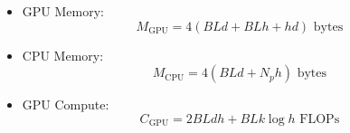 \documentclass[10pt]{article}
\begin{document}
\begin{itemize}
    \item GPU Memory: 
        \begin{equation}
            M_{\text{GPU}} = 4(BLd + BLh + hd) \text{ bytes}
        \end{equation}
    \item CPU Memory:
        \begin{equation}
            M_{\text{CPU}} = 4(BLd + N_ph) \text{ bytes}
        \end{equation}
    \item GPU Compute:
        \begin{equation}
            C_{\text{GPU}} = 2BLdh + BLk\log h \text{ FLOPs}
        \end{equation}
\end{itemize}
\end{document}
